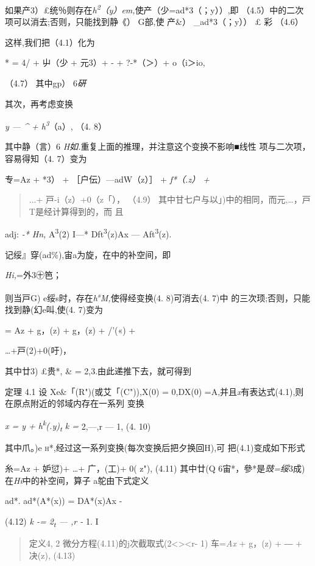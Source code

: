 \documentclass{article}
\begin{document}
如果产3）£统％则存在\emph{h\textsuperscript{2}（y）em,}使产（少=ad*3（；y））,即
（4.5）中的二次项可以消去;否则，只能找到静《） G部,使 产\&）
\_ad*3（；y）） £ 彩 （4.6）

这样,我们把（4.1）化为

* = 4/ + 屮（少 + 元3）+ - + ?-*（＞）+ o（i＞io,

（4.7） 其中gp） 6\emph{硏}

其次，再考虑变换

\emph{y --- \^{} + h\textsuperscript{3}}（a）, （4. 8）

其中静（言）6 \emph{H如.}重复上面的推理，并注意这个变换不影响■线性
项与二次项，容易得知（4. 7）变为

专=Az + *3） + ［户伝）---adW（z）］ + \emph{f*（.z） +}

\begin{quote}
...+ 戸-i（z）+0（\textbar{}z\textbar{}「）， （4.9）
其中甘七户与以」)中的相同，而元,\ldots{}，戸T是经计算得到的，而 且
\end{quote}

adj: \emph{-* Hn,} A\textsuperscript{3}(2) I---*
Dft\textsuperscript{3}(z)Ax --- Aft\textsuperscript{3}(z).

记绥』穿(ad\%),宙a为旋，在中的补空间，即

\emph{Hi,}=外3㊉笆；

则当戸G) e绥s时，存在\emph{h\textsuperscript{s}M,}使得经变换(4.
8)可消去(4. 7)中 的三次顼;否则，只能找到静(幻e叫,使(4. 7)变为

= Az + g，(z) + g，(z) + /'(«) +

\ldots{}+戸(2)+0(\textbar{}吁)，

其中廿3) £贵*, \& = 2,3.由此递推下去，就可得到

定理 4.1 设 Xe\&「(R")(或艾「(C")),X(0) = 0,DX(0)
=A,并且\emph{x}有表达式(4.1),则在原点附近的邻域内存在一系列 变换

\emph{x = y + h\textsuperscript{k}(.y)\textsubscript{t} k =} 2,---,r ---
1, (4. 10)

其中爪。)e \textsc{h*,}经过这一系列变换(每次变换后把夕换回H),可
把(4.1)变成如下形式

糸=Az + 妒愆)+ \ldots{}+ 广，(工)+ 0( \textbar{}z\textbar{}"), (4.11)
其中廿(Q 6宙*，參*是\emph{豉=绥}3成)在\emph{Hi}中的补空间，算子
a鸵由下式定义

ad*. ad*(A*(x)) = DA*(x)Ax -

(4.12) \emph{k -= 2\textsubscript{t} --- ,r -} 1. I

\begin{quote}
定义4, 2
微分方程(4.11)的j次截取式(2\textless{}\textgreater{}\textless{}r- 1)
车=\emph{Ax} + g，(z) + ― + 决(z), (4.13)
\end{quote}
\end{document}
